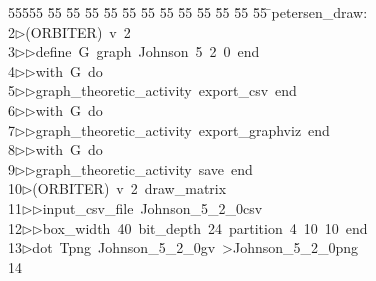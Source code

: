 %
%
\begin{tabbing}
55555 \= 55 \= 55 \= 55 \= 55 \= 55 \= 55 \= 55 \= 55 \= 55 \= 55 \= 55 \= 55 \= \>petersen\_draw:\\[0pt]
2\>$\triangleright$\>(ORBITER)\ v\ 2\ \\[0pt]
3\>$\triangleright$\>$\triangleright$\>define\ G\ graph\ Johnson\ 5\ 2\ 0\ end\ \\[0pt]
4\>$\triangleright$\>$\triangleright$\>with\ G\ do\ \\[0pt]
5\>$\triangleright$\>$\triangleright$\>graph\_theoretic\_activity\ export\_csv\ end\ \\[0pt]
6\>$\triangleright$\>$\triangleright$\>with\ G\ do\ \\[0pt]
7\>$\triangleright$\>$\triangleright$\>graph\_theoretic\_activity\ export\_graphviz\ end\ \\[0pt]
8\>$\triangleright$\>$\triangleright$\>with\ G\ do\ \\[0pt]
9\>$\triangleright$\>$\triangleright$\>graph\_theoretic\_activity\ save\ end\\[0pt]
10\>$\triangleright$\>(ORBITER)\ v\ 2\ draw\_matrix\ \\[0pt]
11\>$\triangleright$\>$\triangleright$\>input\_csv\_file\ Johnson\_5\_2\_0csv\ \\[0pt]
12\>$\triangleright$\>$\triangleright$\>box\_width\ 40\ bit\_depth\ 24\ partition\ 4\ 10\ 10\ end\\[0pt]
13\>$\triangleright$\>dot\ Tpng\ Johnson\_5\_2\_0gv\ {\textgreater}Johnson\_5\_2\_0png\\[0pt]
14\>\end{tabbing}
